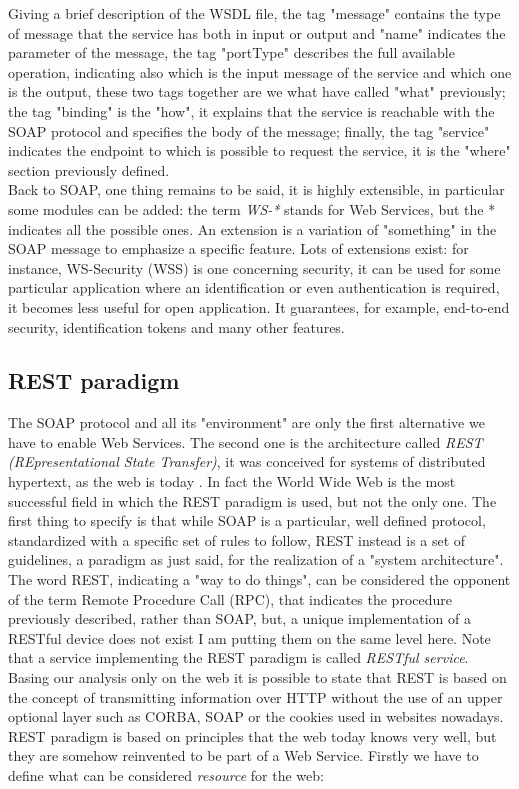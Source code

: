 Giving a brief description of the WSDL file, the tag "message" contains the type of message that the service has both in input or output and "name" indicates the parameter of the message, the tag "portType" describes the full available operation, indicating also which is the input message of the service and which one is the output, these two tags together are we what have called "what" previously; the tag "binding" is the "how", it explains that the service is reachable with the SOAP protocol and specifies the body of the message; finally, the tag "service" indicates the endpoint to which is possible to request the service, it is the "where" section previously defined. \\
Back to SOAP, one thing remains to be said, it is highly extensible, in particular some modules can be added: the term \textit{WS-*} stands for Web Services, but the * indicates all the possible ones. An extension is a variation of "something" in the SOAP message to emphasize a specific feature. Lots of extensions exist: for instance, WS-Security (WSS) is one concerning security, it can be used for some particular application where an identification or even authentication is required, it becomes less useful for open application. It guarantees, for example, end-to-end security, identification tokens and many other features.   

\subsection{REST paradigm}
The SOAP protocol and all its "environment" are only the first alternative we have to enable Web Services. The second one is the architecture called \textit{REST (REpresentational State Transfer)}, it was conceived for systems of distributed hypertext, as the web is today \cite{fielding2000representational}. In fact the World Wide Web is the most successful field in which the REST paradigm is used, but not the only one. The first thing to specify is that while SOAP is a particular, well defined protocol, standardized with a specific set of rules to follow, REST instead is a set of guidelines, a paradigm as just said, for the realization of a "system architecture". The word REST, indicating a "way to do things", can be considered the opponent of the term Remote Procedure Call (RPC), that indicates the procedure previously described, rather than SOAP, but, a unique implementation of a RESTful device does not exist I am putting them on the same level here. Note that a service implementing the REST paradigm is called \textit{RESTful service}.\\
Basing our analysis only on the web it is possible to state that REST is based on the concept of transmitting information over HTTP without the use of an upper optional layer such as CORBA, SOAP or the cookies used in websites nowadays. REST paradigm is based on principles that the web today knows very well, but they are somehow reinvented to be part of a Web Service. Firstly we have to define what can be considered \textit{resource} for the web:


